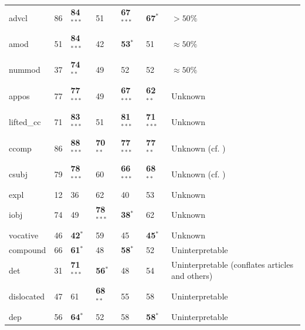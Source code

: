 \documentclass[12pt]{article}
\begin{document}
\begin{table}
\begin{center}
{\begin{tabular}{|l|l|l|ll|l|l|}
\hline
advcl  &  86   &   \textbf{84}$^{***}$   &   51   &   \textbf{67}$^{***}$   &   \textbf{67}$^{*}$  & $>50\%$ \citep{greenberg1963universals,diessel2001ordering} \\
amod  &  51   &   \textbf{84}$^{***}$   &   42   &   \textbf{53}$^{*}$   &   51   & $\approx 50\%$ \citep{dryer1992greenbergian} \\
nummod  &  37   &   \textbf{74}$^{**}$   &   49   &   52   &   52 & $\approx 50\%$ \citep[][89A vs. 83A]{wals} \\

\hline
appos  &  77   &   \textbf{77}$^{***}$   &   49   &   \textbf{67}$^{***}$   &   \textbf{62}$^{**}$ &  Unknown \\%
lifted\_cc  &  71   &   \textbf{83}$^{***}$   &   51   &   \textbf{81}$^{***}$   &   \textbf{71}$^{***}$  & Unknown \\
ccomp  &  86   &   \textbf{88}$^{***}$   &   \textbf{70}$^{**}$   &   \textbf{77}$^{***}$   &   \textbf{77}$^{**}$ & Unknown (cf. \cite{dryer1980positional}) \\ %
csubj  &  79   &   \textbf{78}$^{***}$   &   60   &   \textbf{66}$^{***}$   &   \textbf{68}$^{**}$  & Unknown (cf. \cite{dryer1980positional}) \\%
expl  &  12   &   36   &   62   &   40   &   53  & Unknown \\
iobj  &  74   &   49   &   \textbf{78}$^{***}$   &   \textbf{38}$^{*}$   &   62  & Unknown \\
vocative  &  46   &   \textbf{42}$^{*}$   &   59   &   45   &   \textbf{45}$^{*}$  & Unknown \\

\hline
compound  &  66   &   \textbf{61}$^{*}$   &   48   &   \textbf{58}$^{*}$   &   52  & Uninterpretable \\
det  &  31   &   \textbf{71}$^{***}$   &   \textbf{56}$^{*}$   &   48   &   54  & Uninterpretable (conflates articles and others) \\%
dislocated  &  47   &   61   &   \textbf{68}$^{**}$   &   55   &   58  & Uninterpretable \\
dep  &  56   &   \textbf{64}$^{*}$   &   52   &   58   &   \textbf{58}$^{*}$   & Uninterpretable \\


\end{tabular}}
\end{center}
\end{table}
\end{document}
